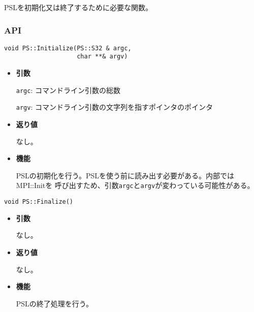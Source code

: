 \documentclass[12pt,a4paper]{jarticle}
\begin{document}
PSLを初期化又は終了するために必要な関数。

\subsubsection{API}

\begin{screen}
\begin{verbatim}
void PS::Initialize(PS::S32 & argc, 
                    char **& argv)
\end{verbatim}
\end{screen}

\begin{itemize}

\item{{\bf 引数}}

{\tt argc}: コマンドライン引数の総数

{\tt argv}: コマンドライン引数の文字列を指すポインタのポインタ

\item{{\bf 返り値}}

なし。

\item{{\bf 機能}}

PSLの初期化を行う。PSLを使う前に読み出す必要がある。内部ではMPI::Initを
呼び出すため、引数{\tt argc}と{\tt argv}が変わっている可能性がある。

\end{itemize}

\begin{screen}
\begin{verbatim}
void PS::Finalize()
\end{verbatim}
\end{screen}

\begin{itemize}

\item{{\bf 引数}}

なし。

\item{{\bf 返り値}}

なし。

\item{{\bf 機能}}

PSLの終了処理を行う。

\end{itemize}



\end{document}
